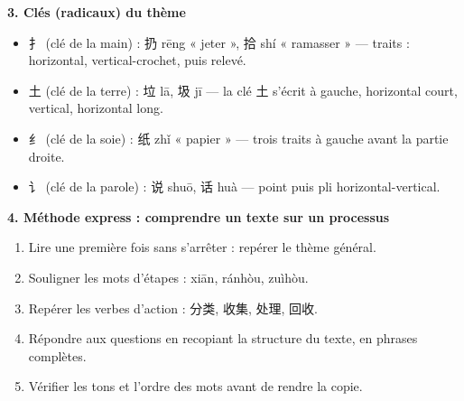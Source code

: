 \documentclass[11pt]{article}
\newcommand{\cle}[1]{{\popxbold\color{popdark}#1}}
\newcommand{\zh}[1]{\ifmmode\text{#1}\else{#1}\fi}
\begin{document}
\begin{bilan}
\textbf{3. Clés (radicaux) du thème}
\begin{itemize}
  \item \cle{扌} (clé de la main) : 扔 rēng « jeter », 拾 shí « ramasser » — traits : horizontal, vertical-crochet, puis relevé.
  \item \cle{土} (clé de la terre) : 垃 lā, 圾 jī — la clé 土 s'écrit à gauche, horizontal court, vertical, horizontal long.
  \item \cle{纟} (clé de la soie) : 纸 zhǐ « papier » — trois traits à gauche avant la partie droite.
  \item \cle{讠} (clé de la parole) : 说 shuō, 话 huà — point puis pli horizontal-vertical.
\end{itemize}

\textbf{4. Méthode express : comprendre un texte sur un processus}
\begin{enumerate}
  \item Lire une première fois sans s'arrêter : repérer le thème général.
  \item Souligner les mots d'étapes : \zh{先} xiān, \zh{然后} ránhòu, \zh{最后} zuìhòu.
  \item Repérer les verbes d'action : 分类, 收集, 处理, 回收.
  \item Répondre aux questions en recopiant la structure du texte, en phrases complètes.
  \item Vérifier les tons et l'ordre des mots avant de rendre la copie.
\end{enumerate}
\end{bilan}
\end{document}

